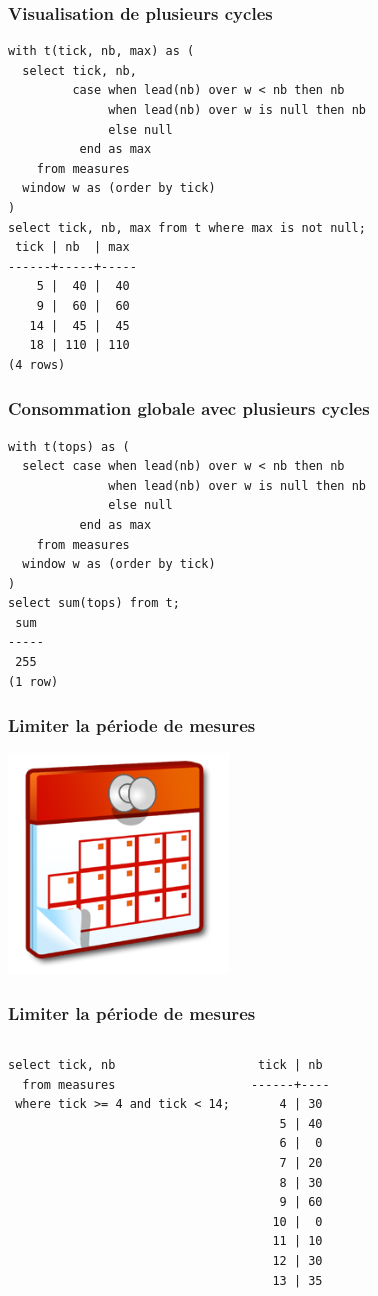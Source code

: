\documentclass{beamer}
\begin{document}
\begin{frame}[fragile]
  \frametitle{Visualisation de plusieurs cycles}

\begin{verbatim}
with t(tick, nb, max) as (
  select tick, nb,
         case when lead(nb) over w < nb then nb
              when lead(nb) over w is null then nb
              else null
          end as max
    from measures
  window w as (order by tick)
)
select tick, nb, max from t where max is not null;
 tick | nb  | max 
------+-----+-----
    5 |  40 |  40
    9 |  60 |  60
   14 |  45 |  45
   18 | 110 | 110
(4 rows)
\end{verbatim}
\end{frame}


\begin{frame}[fragile]
  \frametitle{Consommation globale avec plusieurs cycles}

\begin{verbatim}
with t(tops) as (
  select case when lead(nb) over w < nb then nb
              when lead(nb) over w is null then nb
              else null
          end as max
    from measures
  window w as (order by tick)
)
select sum(tops) from t;
 sum 
-----
 255
(1 row)
\end{verbatim}
\end{frame}

\begin{frame}[fragile]
  \frametitle{Limiter la période de mesures}

  \begin{center}
    \includegraphics[height=2.3in]{calendar.png}
  \end{center}
\end{frame}

\begin{frame}[fragile]
  \frametitle{Limiter la période de mesures}

\begin{columns}
\begin{verbatim}
select tick, nb
  from measures
 where tick >= 4 and tick < 14;
\end{verbatim}

\begin{verbatim}
 tick | nb 
------+----
    4 | 30
    5 | 40
    6 |  0
    7 | 20
    8 | 30
    9 | 60
   10 |  0
   11 | 10
   12 | 30
   13 | 35
\end{verbatim}
\end{columns}
\end{frame}
\end{document}
